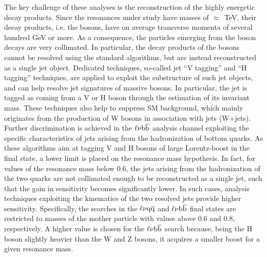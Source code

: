 The key challenge of these analyses is the reconstruction of the highly energetic decay products.
Since the resonances under study have masses of $\approx$~TeV, their decay products, i.e. the bosons,
have on average transverse momenta of several hundred GeV or more.
As a consequence, the particles emerging from the boson decays are very collimated.
In particular, the decay products of the bosons cannot be resolved using the standard algorithms,
but are instead reconstructed as a single jet object. Dedicated techniques, so-called jet ``V tagging'' and ``H tagging'' techniques,
are applied to exploit the substructure of such jet objects, and can help resolve jet signatures of massive bosons.
In particular, the jet is tagged as coming from a V or H boson through the estimation of its invariant mass.
These techniques also help to suppress SM background, which mainly originates from the production of W bosons in association with jets (W+jets).
Further discrimination is achieved in the $\ell\nu{\mathrm{b}\overline{\mathrm{b}}}$ analysis channel exploiting the specific characteristics of jets arising from the hadronization of bottom quarks.
As these algorithms aim at tagging V and H bosons of large Lorentz-boost in the final state, a lower limit is placed on the resonance mass hypothesis.
In fact, for values of the resonance mass below 0.6\TeV, the jets arising from the hadronization of the two quarks are not collimated enough to be reconstructed as a single jet,
such that the gain in sensitivity becomes significantly lower. In such cases, analysis techniques exploiting the kinematics of the two resolved jets provide higher sensitivity.
Specifically, the searches in the $\ell\nu\mathrm{q}\overline{\mathrm{q}}$ and $\ell\nu{\mathrm{b}\overline{\mathrm{b}}}$ final states are restricted to masses of the mother particle with values above 0.6 and 0.8\TeV, respectively.
A higher value is chosen for the $\ell\nu{\mathrm{b}\overline{\mathrm{b}}}$ search because, being the H boson slightly heavier than the W and Z bosons, it acquires a smaller boost for a given resonance mass.\\

